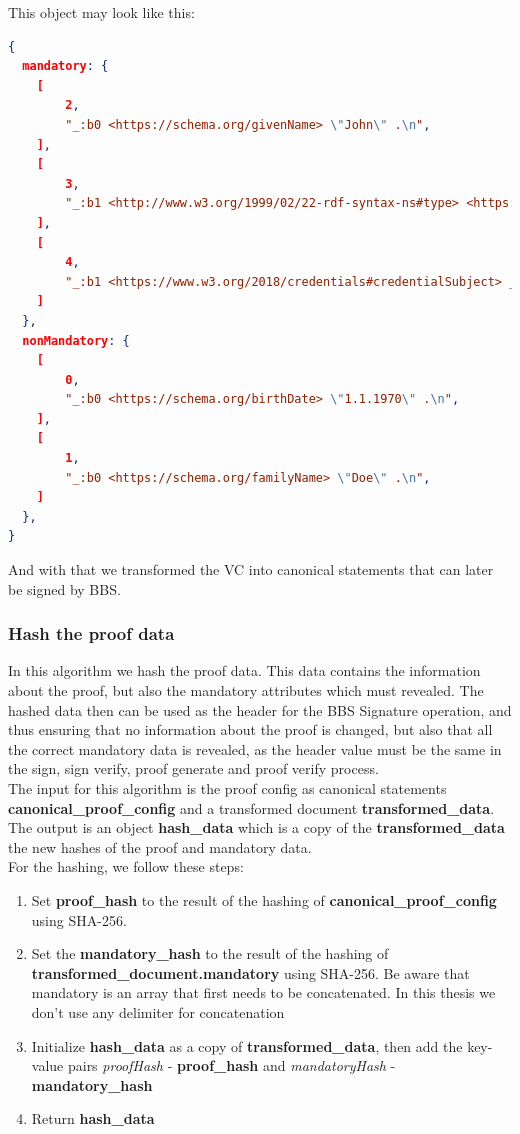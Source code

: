\documentclass[
	a4paper               %
	,BCOR=0mm            %
	,bibliography=totoc   %
	,listof=totoc         %
	,monolingual
	,twoside=false
]{bfhthesis}              %
\begin{document}
This object may look like this:

\begin{lstlisting}[language=json,firstnumber=1,caption={Return object of the VC transformation},captionpos=b]
{
  mandatory: {
	[
		2,
		"_:b0 <https://schema.org/givenName> \"John\" .\n",
	],
	[
		3,
		"_:b1 <http://www.w3.org/1999/02/22-rdf-syntax-ns#type> <https://www.w3.org/2018/credentials#VerifiableCredential> .\n",
  	],
  	[
		4,
		"_:b1 <https://www.w3.org/2018/credentials#credentialSubject> _:b0 .\n",
	]
  },
  nonMandatory: {
	[
		0,
		"_:b0 <https://schema.org/birthDate> \"1.1.1970\" .\n",
	],
	[
		1,
		"_:b0 <https://schema.org/familyName> \"Doe\" .\n",
	]
  },
}
\end{lstlisting}

And with that we transformed the VC into canonical statements that can later be signed by BBS.

\subsubsection{Hash the proof data}
\label{subsec:proofHash}
In this algorithm we hash the proof data. This data contains the information about the proof, but also the mandatory attributes which must revealed.
The hashed data then can be used as the header for the BBS Signature operation, and thus ensuring that no information about the proof is changed, but also that all the correct mandatory data is revealed, as the header value must be the same in the sign, sign verify, proof generate and proof verify process.\\

The input for this algorithm is the proof config as canonical statements \textbf{canonical\_proof\_config} and a transformed document \textbf{transformed\_data}.\\

The output is an object \textbf{hash\_data} which is a copy of the \textbf{transformed\_data} the new hashes of the proof and mandatory data.\\

For the hashing, we follow these steps:
\begin{enumerate}
	\item Set \textbf{proof\_hash} to the result of the hashing of \textbf{canonical\_proof\_config} using SHA-256.
	\item Set the \textbf{mandatory\_hash} to the result of the hashing of \textbf{transformed\_document.mandatory} using SHA-256. Be aware that mandatory is an array that first needs to be concatenated. In this thesis we don't use any delimiter for concatenation
	\item Initialize \textbf{hash\_data} as a copy of \textbf{transformed\_data}, then add the key-value pairs \textit{proofHash} - \textbf{proof\_hash} and \textit{mandatoryHash} - \textbf{mandatory\_hash}
	\item Return \textbf{hash\_data}
\end{enumerate}
\end{document}
